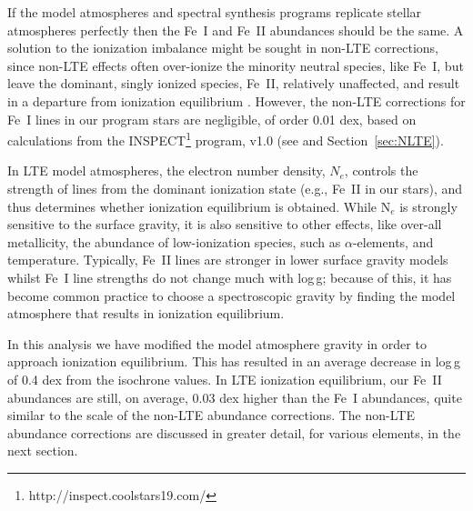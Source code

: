\documentclass[revtex4]{emulateapj}
\begin{document}
If the model atmospheres and spectral synthesis programs replicate stellar atmospheres perfectly then the Fe~I and Fe~II abundances should be the same.  A solution to the ionization imbalance might be sought in non-LTE corrections, since non-LTE effects often over-ionize the minority neutral species, like Fe~I, but leave the dominant, singly ionized species, Fe~II, relatively unaffected, and result in a departure from ionization equilibrium \citep[e.g.][]{AthayLites72}.  However, the non-LTE corrections for Fe~I lines in our program stars are negligible, of order 0.01 dex, based on calculations from the INSPECT\footnote{http://inspect.coolstars19.com/} program, v1.0 (see \citet{Lind2012} and Section~\ref{sec:NLTE}). 

In LTE model atmospheres, the electron number density, $N_e$, controls the strength of lines from the dominant ionization state (e.g., Fe~II in our stars), and thus determines whether ionization equilibrium is obtained.  While N$_e$ is strongly sensitive to the surface gravity, it is also sensitive to other effects, like over-all metallicity, the abundance of low-ionization species, such as $\alpha$-elements, and temperature.  Typically, Fe~II lines are stronger in lower surface gravity models whilst Fe~I line strengths do not change much with log\,g; because of this, it has become common practice to choose a spectroscopic gravity by finding the model atmosphere that results in ionization equilibrium.
      
In this analysis we have modified the model atmosphere gravity in order to approach ionization equilibrium.  This has resulted in an average decrease in log\,g of 0.4 dex from the isochrone values.  In LTE ionization equilibrium, our Fe~II abundances are still, on average, 0.03 dex higher than the Fe~I abundances, quite similar to the scale of the non-LTE abundance corrections.  The non-LTE abundance corrections are discussed in greater detail, for various elements, in the next section.
\end{document}
